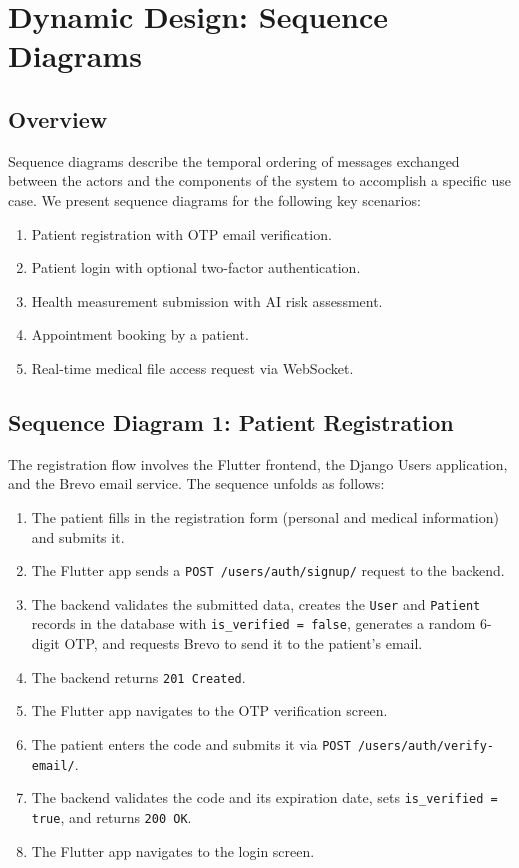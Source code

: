 \section{Dynamic Design: Sequence Diagrams}

\subsection{Overview}

Sequence diagrams describe the temporal ordering of messages exchanged between the actors and the components of the system to accomplish a specific use case. We present sequence diagrams for the following key scenarios:

\begin{enumerate}
    \item Patient registration with OTP email verification.
    \item Patient login with optional two-factor authentication.
    \item Health measurement submission with AI risk assessment.
    \item Appointment booking by a patient.
    \item Real-time medical file access request via WebSocket.
\end{enumerate}

\subsection{Sequence Diagram 1: Patient Registration}

The registration flow involves the Flutter frontend, the Django Users application, and the Brevo email service. The sequence unfolds as follows:

\begin{enumerate}
    \item The patient fills in the registration form (personal and medical information) and submits it.
    \item The Flutter app sends a \texttt{POST /users/auth/signup/} request to the backend.
    \item The backend validates the submitted data, creates the \texttt{User} and \texttt{Patient} records in the database with \texttt{is\_verified = false}, generates a random 6-digit OTP, and requests Brevo to send it to the patient's email.
    \item The backend returns \texttt{201 Created}.
    \item The Flutter app navigates to the OTP verification screen.
    \item The patient enters the code and submits it via \texttt{POST /users/auth/verify-email/}.
    \item The backend validates the code and its expiration date, sets \texttt{is\_verified = true}, and returns \texttt{200 OK}.
    \item The Flutter app navigates to the login screen.
\end{enumerate}

